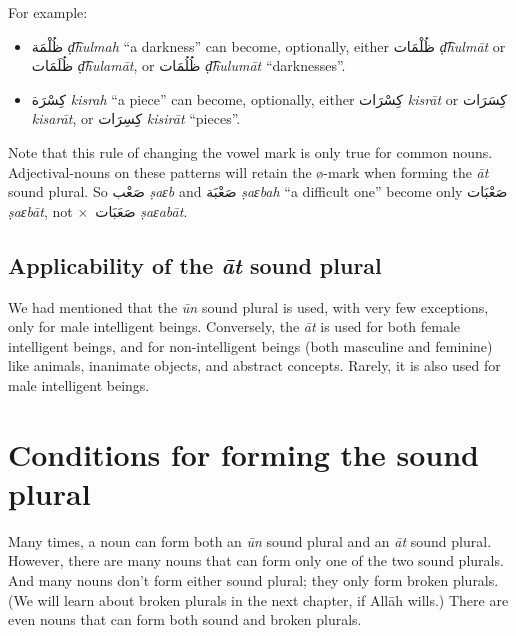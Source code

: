\documentclass[
  10pt,
]{book}
\providecommand{\tightlist}{%
  \setlength{\itemsep}{0pt}\setlength{\parskip}{0pt}}
\begin{document}
\begin{enumerate}
  For example:

  \begin{itemize}
  \tightlist
  \item
    \foreignlanguage{arabic}{ظُلْمَة} \emph{ḍ͡hulmah} \enquote{a darkness} can become, optionally, either \foreignlanguage{arabic}{ظُلْمَات} \emph{ḍ͡hulmāt} or \foreignlanguage{arabic}{ظُلَمَات} \emph{ḍ͡hulamāt}, or \foreignlanguage{arabic}{ظُلُمَات} \emph{ḍ͡hulumāt} \enquote{darknesses}.
  \item
    \foreignlanguage{arabic}{کِسْرَة} \emph{kisrah} \enquote{a piece} can become, optionally, either \foreignlanguage{arabic}{کِسْرَات} \emph{kisrāt} or \foreignlanguage{arabic}{کِسَرَات} \emph{kisarāt}, or \foreignlanguage{arabic}{کِسِرَات} \emph{kisirāt} \enquote{pieces}.
  \end{itemize}
\end{enumerate}

Note that this rule of changing the vowel mark is only true for common nouns. Adjectival-nouns on these patterns will retain the ø-mark when forming the \emph{āt} sound plural. So \foreignlanguage{arabic}{صَعْب} \emph{ṣaɛb} and \foreignlanguage{arabic}{صَعْبَة} \emph{ṣaɛbah} \enquote{a difficult one} become only \foreignlanguage{arabic}{صَعْبَات} \emph{ṣaɛbāt}, not \(\times\)~\foreignlanguage{arabic}{صَعَبَات} \emph{ṣaɛabāt}.

\subsection{\texorpdfstring{Applicability of the \emph{āt} sound plural}{Applicability of the āt sound plural}}\label{applicability-of-the-at-sound-plural}

We had mentioned that the \emph{ūn} sound plural is used, with very few exceptions, only for male intelligent beings. Conversely, the \emph{āt} is used for both female intelligent beings, and for non-intelligent beings (both masculine and feminine) like animals, inanimate objects, and abstract concepts. Rarely, it is also used for male intelligent beings.

\section{Conditions for forming the sound plural}\label{conditions-for-forming-the-sound-plural}

Many times, a noun can form both an \emph{ūn} sound plural and an \emph{āt} sound plural.
However, there are many nouns that can form only one of the two sound plurals.
And many nouns don't form either sound plural; they only form broken plurals. (We will learn about broken plurals in the next chapter, if Allāh wills.) There are even nouns that can form both sound and broken plurals.
\end{document}
